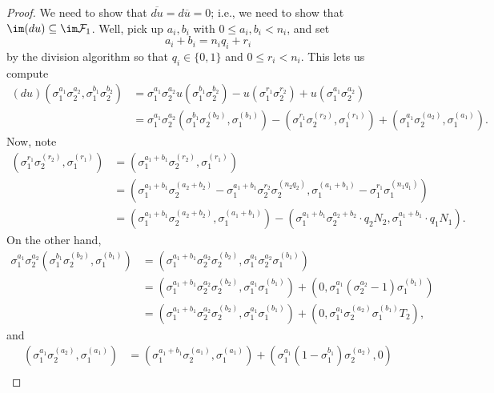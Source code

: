 \documentclass{article}
\begin{document}
\begin{proof}
	We need to show that $\overline{du}=d\overline u=0$; i.e., we need to show that $\im(du)\subseteq\im\mathcal F_1$. Well, pick up $a_i,b_i$ with $0\le a_i,b_i<n_i$, and set
	\[a_i+b_i=n_iq_i+r_i\]
	by the division algorithm so that $q_i\in\{0,1\}$ and $0\le r_i<n_i$. This lets us compute
	\begin{align*}
		(du)\left(\sigma_1^{a_1}\sigma_2^{a_2},\sigma_1^{b_1}\sigma_2^{b_2}\right) &= \sigma_1^{a_1}\sigma_2^{a_2}u\left(\sigma_1^{b_1}\sigma_2^{b_2}\right)-u\left(\sigma_1^{r_1}\sigma_2^{r_2}\right)+u\left(\sigma_1^{a_1}\sigma_2^{a_2}\right) \\
		&= \sigma_1^{a_1}\sigma_2^{a_2}\left(\sigma_1^{b_1}\sigma_2^{(b_2)},\sigma_1^{(b_1)}\right)-\left(\sigma_1^{r_1}\sigma_2^{(r_2)},\sigma_1^{(r_1)}\right)+\left(\sigma_1^{a_1}\sigma_2^{(a_2)},\sigma_1^{(a_1)}\right).
	\end{align*}
	Now, note
	\begin{align*}
		\left(\sigma_1^{r_1}\sigma_2^{(r_2)},\sigma_1^{(r_1)}\right) &= \left(\sigma_1^{a_1+b_1}\sigma_2^{(r_2)},\sigma_1^{(r_1)}\right) \\
		&= \left(\sigma_1^{a_1+b_1}\sigma_2^{(a_2+b_2)}-\sigma_1^{a_1+b_1}\sigma_2^{r_2}\sigma_2^{(n_2q_2)},\sigma_1^{(a_1+b_1)}-\sigma_1^{r_1}\sigma_1^{(n_1q_1)}\right) \\
		&= \left(\sigma_1^{a_1+b_1}\sigma_2^{(a_2+b_2)},\sigma_1^{(a_1+b_1)}\right)-\left(\sigma_1^{a_1+b_1}\sigma_2^{a_2+b_2}\cdot q_2N_2,\sigma_1^{a_1+b_1}\cdot q_1N_1\right).
	\end{align*}
	On the other hand,
	\begin{align*}
		\sigma_1^{a_1}\sigma_2^{a_2}\left(\sigma_1^{b_1}\sigma_2^{(b_2)},\sigma_1^{(b_1)}\right) &= \left(\sigma_1^{a_1+b_1}\sigma_2^{a_2}\sigma_2^{(b_2)},\sigma_1^{a_1}\sigma_2^{a_2}\sigma_1^{(b_1)}\right) \\
		&= \left(\sigma_1^{a_1+b_1}\sigma_2^{a_2}\sigma_2^{(b_2)},\sigma_1^{a_1}\sigma_1^{(b_1)}\right)+\left(0,\sigma_1^{a_1}\left(\sigma_2^{a_2}-1\right)\sigma_1^{(b_1)}\right) \\
		&= \left(\sigma_1^{a_1+b_1}\sigma_2^{a_2}\sigma_2^{(b_2)},\sigma_1^{a_1}\sigma_1^{(b_1)}\right)+\left(0,\sigma_1^{a_1}\sigma_2^{(a_2)}\sigma_1^{(b_1)}T_2\right),
	\end{align*}
	and
	\begin{align*}
		\left(\sigma_1^{a_1}\sigma_2^{(a_2)},\sigma_1^{(a_1)}\right) &= \left(\sigma_1^{a_1+b_1}\sigma_2^{(a_1)},\sigma_1^{(a_1)}\right)+\left(\sigma_1^{a_1}\left(1-\sigma_1^{b_1}\right)\sigma_2^{(a_2)},0\right) \\

\end{align*}
\end{proof}
\end{document}
